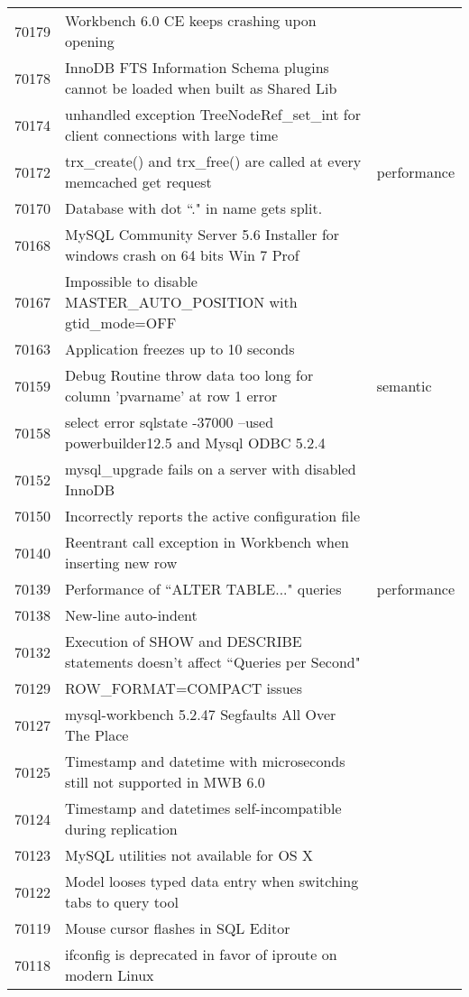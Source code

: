 \begin{longtable}[c]{p{1cm}p{10cm}p{1cm}}
70179 & Workbench 6.0 CE keeps crashing upon opening &  \\
70178 & InnoDB FTS Information Schema plugins cannot be loaded when built as Shared Lib &  \\
70174 & unhandled exception TreeNodeRef\_set\_int for client connections with large time &  \\
70172 & trx\_create() and trx\_free() are called at every memcached get request & performance \\
70170 & Database with dot ``." in name gets split. &  \\
70168 & MySQL Community Server 5.6 Installer for windows crash on 64 bits Win 7 Prof &  \\
70167 & Impossible to disable MASTER\_AUTO\_POSITION with gtid\_mode=OFF &  \\
70163 & Application freezes up to 10 seconds &  \\
70159 & Debug Routine throw data too long for column 'pvarname' at row 1 error & semantic \\
70158 & select error sqlstate -37000 --used powerbuilder12.5 and Mysql ODBC 5.2.4 &  \\
70152 & mysql\_upgrade fails on a server with disabled InnoDB &  \\
70150 & Incorrectly reports the active configuration file &  \\
70140 & Reentrant call exception in Workbench when inserting new row &  \\
70139 & Performance of ``ALTER TABLE..." queries & performance \\
70138 & New-line auto-indent &  \\
70132 & Execution of SHOW and DESCRIBE statements doesn't affect ``Queries per Second" &  \\
70129 & ROW\_FORMAT=COMPACT issues &  \\
70127 & mysql-workbench 5.2.47 Segfaults All Over The Place &  \\
70125 & Timestamp and datetime with microseconds still not supported in MWB 6.0 &  \\
70124 & Timestamp and datetimes self-incompatible during replication &  \\
70123 & MySQL utilities not available for OS X &  \\
70122 & Model looses typed data entry when switching tabs to query tool &  \\
70119 & Mouse cursor flashes in SQL Editor &  \\
70118 & ifconfig is deprecated in favor of iproute on modern Linux &  \\

\end{longtable}
